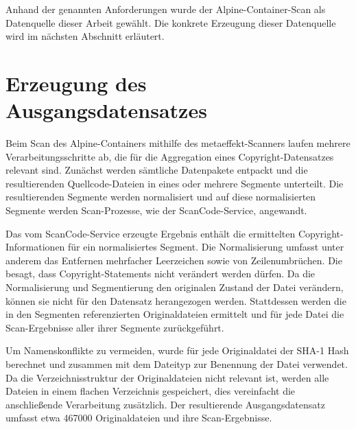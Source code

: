 Anhand der genannten Anforderungen wurde der Alpine-Container-Scan als Datenquelle dieser Arbeit gewählt.
Die konkrete Erzeugung dieser Datenquelle wird im nächsten Abschnitt erläutert.


\section{Erzeugung des Ausgangsdatensatzes}\label{sec:erzeugung-datensatz}

Beim Scan des Alpine-Containers mithilfe des metaeffekt-Scanners laufen mehrere Verarbeitungsschritte ab, die für die Aggregation eines Copyright-Datensatzes relevant sind.
Zunächst werden sämtliche Datenpakete entpackt und die resultierenden Quellcode-Dateien in eines oder mehrere Segmente unterteilt.
Die resultierenden Segmente werden normalisiert und auf diese normalisierten Segmente werden Scan-Prozesse, wie der ScanCode-Service, angewandt.

Das vom ScanCode-Service erzeugte Ergebnis enthält die ermittelten Copyright-Informationen für ein normalisiertes Segment.
Die Normalisierung umfasst unter anderem das Entfernen mehrfacher Leerzeichen sowie von Zeilenumbrüchen.
Die  besagt, dass Copyright-Statements nicht verändert werden dürfen.
Da die Normalisierung und Segmentierung den originalen Zustand der Datei verändern, können sie nicht für den Datensatz herangezogen werden.
Stattdessen werden die in den Segmenten referenzierten Originaldateien ermittelt und für jede Datei die Scan-Ergebnisse aller ihrer Segmente zurückgeführt.

Um Namenskonflikte zu vermeiden, wurde für jede Originaldatei der SHA-1 Hash berechnet und zusammen mit dem Dateityp zur Benennung der Datei verwendet.
Da die Verzeichnisstruktur der Originaldateien nicht relevant ist, werden alle Dateien in einem flachen Verzeichnis gespeichert, dies vereinfacht die anschließende Verarbeitung zusätzlich.
Der resultierende Ausgangsdatensatz umfasst etwa \num{467000} Originaldateien und ihre Scan-Ergebnisse.


